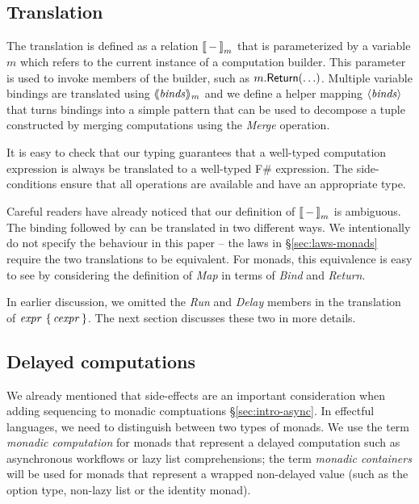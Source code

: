 \documentclass[runningheads,a4paper]{llncs}
\begin{document}

\subsection{Translation}
\label{sec:semantics-transl}

The translation is defined as a relation $|[ \,-\, |]_m$ that is parameterized by a variable $m$ which
refers to the current instance of a computation builder. This parameter is used 
to invoke members of the builder, such as $m.\textnormal{\sffamily Return}(\ldots)$. Multiple 
variable bindings are translated using $\langle\hspace{-0.25em}\langle \textnormal{\emph{binds}} \rangle\hspace{-0.25em}\rangle_m$ and we define a helper mapping 
$\langle \textnormal{\emph{binds}} \rangle$ that turns bindings into a simple pattern that can be used to decompose a tuple
constructed by merging computations using the \emph{Merge} operation.

It is easy to check that our typing guarantees that a well-typed computation expression
is always be translated to a well-typed F\# expression. The side-conditions ensure that all
operations are available and have an appropriate type.

Careful readers have already noticed that our definition of $|[ \,-\, |]_m$ is ambiguous. The 
 binding followed by  can be translated in two different ways. 
We intentionally do not specify the behaviour in this paper -- the laws in \S\ref{sec:laws-monads} 
require the two translations to be equivalent. For monads, this equivalence is easy to see 
by considering the definition of \emph{Map} in terms of \emph{Bind} and \emph{Return}.

In earlier discussion, we omitted the \emph{Run} and \emph{Delay} members in the translation of
$\textnormal{\emph{expr}}~\{\,\textnormal{\emph{cexpr}}\,\}$. The next section discusses these two in more details.


\subsection{Delayed computations}
\label{sec:semantics-delayed}

We already mentioned that side-effects are an important consideration when adding sequencing to
monadic comptuations \S\ref{sec:intro-async}. In effectful languages, we need to distinguish 
between two types of monads. We use the term \emph{monadic computation} for monads that represent 
a delayed computation such as asynchronous workflows or lazy list comprehensions; the term 
\emph{monadic containers} will be used for monads that represent a wrapped non-delayed value
(such as the option type, non-lazy list or the identity monad).
\end{document}
